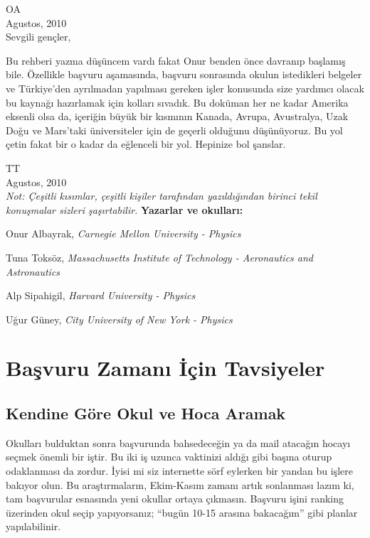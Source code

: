 \documentclass[12pt]{article}
\begin{document}
\noindent OA \\
Agustos, 2010 \\

\noindent Sevgili gençler, 

Bu rehberi yazma düşüncem vardı fakat Onur benden önce davranıp başlamış bile. Özellikle başvuru aşamasında, başvuru sonrasında okulun istedikleri belgeler ve Türkiye'den ayrılmadan yapılması gereken işler konusunda size yardımcı olacak bu kaynağı hazırlamak için kolları sıvadık. Bu doküman her ne kadar Amerika eksenli olsa da, içeriğin büyük bir kısmının Kanada, Avrupa, Avustralya, Uzak Doğu ve Mars'taki üniversiteler için de geçerli olduğunu düşünüyoruz. Bu yol çetin fakat bir o kadar da eğlenceli bir yol. Hepinize bol şanslar.   

\noindent TT \\
Agustos, 2010 \\

\textit{Not: Çeşitli kısımlar, çeşitli kişiler tarafından yazıldığından birinci tekil konuşmalar sizleri şaşırtabilir. 
}
\newpage
\textbf{Yazarlar ve okulları: }

Onur Albayrak, \textit{Carnegie Mellon University - Physics }

Tuna Toksöz, \textit{Massachusetts Institute of Technology - Aeronautics and \\ Astronautics }

Alp Sipahigil, \textit{Harvard University - Physics }

Uğur Güney, \textit{City University of New York - Physics }

\newpage
\section{Başvuru Zamanı İçin Tavsiyeler }
\subsection{Kendine Göre Okul ve Hoca Aramak }


Okulları bulduktan sonra başvurunda bahsedeceğin ya da mail atacağın hocayı seçmek önemli bir iştir. Bu iki iş uzunca vaktinizi aldığı gibi başına oturup odaklanması da zordur. İyisi mi siz internette sörf eylerken bir yandan bu işlere bakıyor olun. Bu araştırmaların, Ekim-Kasım zamanı artık sonlanması lazım ki, tam başvurular esnasında yeni okullar ortaya çıkmasın. Başvuru işini ranking üzerinden okul seçip yapıyorsanız; “bugün 10-15 arasına bakacağım” gibi planlar yapılabilinir. 
\end{document}
